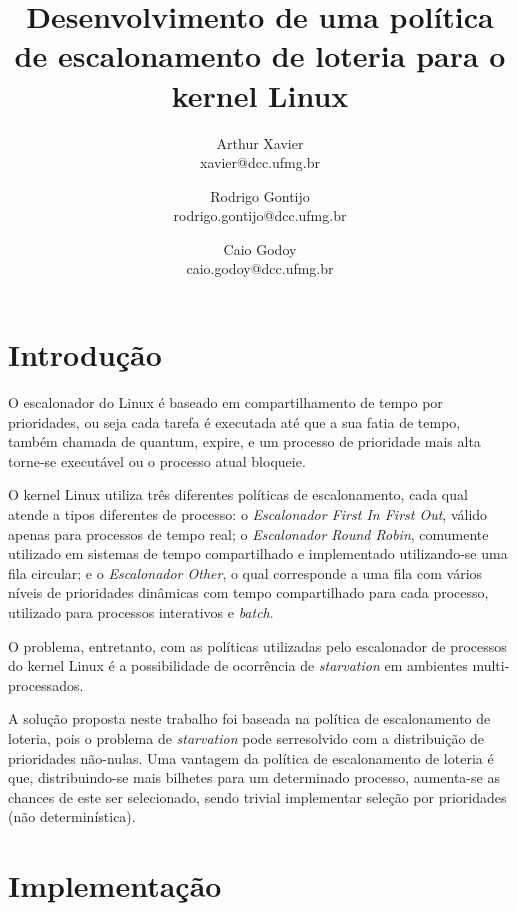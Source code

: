 \documentclass[a4paper,12pt]{article}
\title{Desenvolvimento de uma política de escalonamento de loteria para o kernel Linux}
\author{
    Arthur Xavier\\
    \small{xavier@dcc.ufmg.br}
    \and
    Rodrigo Gontijo\\
    \small{rodrigo.gontijo@dcc.ufmg.br}
    \and
    Caio Godoy\\
    \small{caio.godoy@dcc.ufmg.br}
}
\begin{document}
\maketitle


\section{Introdução}
O escalonador do Linux é baseado em compartilhamento de tempo por prioridades, ou seja cada tarefa é executada até que a sua fatia de tempo, também chamada de quantum, expire, e um processo de prioridade mais alta torne-se executável ou o processo atual bloqueie.

O kernel Linux utiliza três diferentes políticas de escalonamento, cada qual atende a tipos diferentes de processo: o \emph{Escalonador First In First Out}, válido apenas para processos de tempo real; o \emph{Escalonador Round Robin}, comumente utilizado em sistemas de tempo compartilhado e implementado utilizando-se uma fila circular; e o \emph{Escalonador Other}, o qual corresponde a uma fila com vários níveis de prioridades dinâmicas com tempo compartilhado para cada processo, utilizado para processos interativos e \emph{batch}.

O problema, entretanto, com as políticas utilizadas pelo escalonador de processos do kernel Linux é a possibilidade de ocorrência de \emph{starvation} em ambientes multi-processados.

A solução proposta neste trabalho foi baseada na política de escalonamento de loteria\cite{LSWikipedia2015}, pois o problema de \emph{starvation} pode serresolvido com a distribuição de prioridades não-nulas. Uma vantagem da política de escalonamento de loteria é que, distribuindo-se mais bilhetes para um determinado processo, aumenta-se as chances de este ser selecionado, sendo trivial implementar seleção por prioridades (não determinística).


\section{Implementação}
\end{document}
